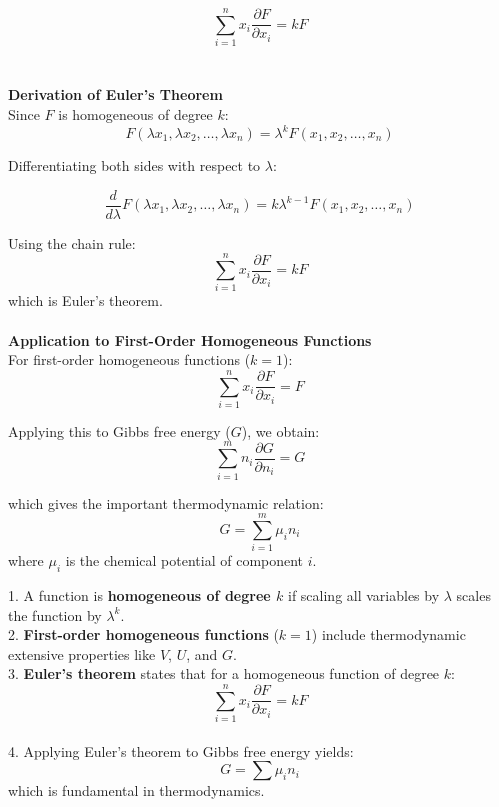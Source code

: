 \documentclass{article}
\theoremstyle{definition}
\begin{document}
\begin{mdframed}[style=MyFrame, frametitle={Definition of Homogeneous Functions}]
\begin{equation}
    \sum_{i=1}^{n} x_i \frac{\partial F}{\partial x_i} = k F
\end{equation}
\\
\\

\textbf{Derivation of Euler’s Theorem}
\\
Since $F$ is homogeneous of degree $k$:
\begin{equation}
    F(\lambda x_1, \lambda x_2, \dots, \lambda x_n) = \lambda^k F(x_1, x_2, \dots, x_n)
\end{equation}

Differentiating both sides with respect to $\lambda$:

\begin{equation}
    \frac{d}{d\lambda} F(\lambda x_1, \lambda x_2, \dots, \lambda x_n) = k \lambda^{k-1} F(x_1, x_2, \dots, x_n)
\end{equation}

Using the chain rule:
\begin{equation}
    \sum_{i=1}^{n} x_i \frac{\partial F}{\partial x_i} = k F
\end{equation}
which is Euler’s theorem.
\\
\\

\textbf{Application to First-Order Homogeneous Functions}
\\
For first-order homogeneous functions ($k = 1$):
\begin{equation}
    \sum_{i=1}^{n} x_i \frac{\partial F}{\partial x_i} = F
\end{equation}

Applying this to Gibbs free energy ($G$), we obtain:
\begin{equation}
    \sum_{i=1}^{m} n_i \frac{\partial G}{\partial n_i} = G
\end{equation}

which gives the important thermodynamic relation:
\begin{equation}
    G = \sum_{i=1}^{m} \mu_i n_i
\end{equation}
where $\mu_i$ is the chemical potential of component $i$.


1. A function is \textbf{homogeneous of degree $k$} if scaling all variables by $\lambda$ scales the function by $\lambda^k$.\\
2. \textbf{First-order homogeneous functions} ($k=1$) include thermodynamic extensive properties like $V$, $U$, and $G$.\\
3. \textbf{Euler’s theorem} states that for a homogeneous function of degree $k$:
   \begin{equation}
       \sum_{i=1}^{n} x_i \frac{\partial F}{\partial x_i} = k F
   \end{equation}\\
4. Applying Euler’s theorem to Gibbs free energy yields:
   \begin{equation}
       G = \sum \mu_i n_i
   \end{equation}
   which is fundamental in thermodynamics.\\


\end{mdframed}
\end{document}
